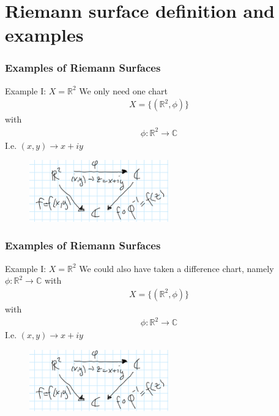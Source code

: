 \documentclass{beamer}[10]
\begin{document}
\section{Riemann surface definition and examples}
\begin{frame}
	\frametitle{Examples of Riemann Surfaces}
	\begin{block}{Example I: $X=\mathds{R}^2$}
		We only need one chart
		\begin{equation}
			\begin{aligned}
				X=\{(\mathds{R}^2,\phi)\}
			\end{aligned}
		\end{equation}
		with
		\begin{equation}
			\begin{aligned}
				\phi: \mathds{R}^2\to \mathds{C}
			\end{aligned}
		\end{equation}
	I.e. $(x,y)\to x+iy$
	\end{block}
\begin{figure}
	\includegraphics[width=6cm]{6}
\end{figure}
\end{frame} 

\begin{frame}
	\frametitle{Examples of Riemann Surfaces}
	\begin{block}{Example I: $X=\mathds{R}^2$}
	We could also have taken a difference chart, namely $\phi:\mathds{R}^2\to \mathds{C}$ with 
		\begin{equation}
			\begin{aligned}
				X=\{(\mathds{R}^2,\phi)\}
			\end{aligned}
		\end{equation}
		with
		\begin{equation}
			\begin{aligned}
				\phi: \mathds{R}^2\to \mathds{C}
			\end{aligned}
		\end{equation}
		I.e. $(x,y)\to x+iy$
	\end{block}
	\begin{figure}
		\includegraphics[width=6cm]{6}
	\end{figure}
\end{frame}
\end{document}
